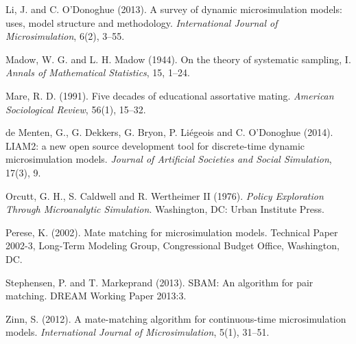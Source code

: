 \documentclass[12pt,a4paper]{article}
\begin{document}
\begin{list}{}{\setlength{\leftmargin}{1.5em}\setlength{\itemindent}{-1.5em}\setlength{\itemsep}{3pt}\setlength{\parsep}{0pt}\small}
\item Li, J. and C. O'Donoghue (2013). A survey of dynamic microsimulation models: uses, model
structure and methodology. \emph{International Journal of Microsimulation}, 6(2), 3--55.

\item Madow, W. G. and L. H. Madow (1944). On the theory of systematic sampling, I. \emph{Annals
of Mathematical Statistics}, 15, 1--24.

\item Mare, R. D. (1991). Five decades of educational assortative mating. \emph{American
Sociological Review}, 56(1), 15--32.

\item de Menten, G., G. Dekkers, G. Bryon, P. Liégeois and C. O'Donoghue (2014). LIAM2: a new
open source development tool for discrete-time dynamic microsimulation models. \emph{Journal of
Artificial Societies and Social Simulation}, 17(3), 9.

\item Orcutt, G. H., S. Caldwell and R. Wertheimer II (1976). \emph{Policy Exploration Through
Microanalytic Simulation}. Washington, DC: Urban Institute Press.

\item Perese, K. (2002). Mate matching for microsimulation models. Technical Paper 2002-3,
Long-Term Modeling Group, Congressional Budget Office, Washington, DC.

\item Stephensen, P. and T. Markeprand (2013). SBAM: An algorithm for pair matching. DREAM
Working Paper 2013:3.

\item Zinn, S. (2012). A mate-matching algorithm for continuous-time microsimulation models.
\emph{International Journal of Microsimulation}, 5(1), 31--51.

\end{list}
\end{document}
